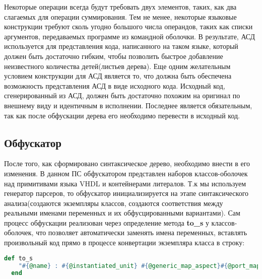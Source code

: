 Некоторые операции всегда будут требовать двух элементов, таких, как два слагаемых для операции суммирования. Тем не менее, некоторые языковые конструкции требуют сколь угодно большого числа операндов, таких как списки аргументов, передаваемых программе из командной оболочки. В результате, АСД используется для представления кода, написанного на таком языке, который должен быть достаточно гибким, чтобы позволить быстрое добавление неизвестного количества детей(листьев дерева).
Еще одним желательным условием конструкции для АСД является то, что должна быть обеспечена возможность представления АСД в виде исходного кода. Исходный код, сгенерированный из АСД, должен быть достаточно похожим на оригинал по внешнему виду и идентичным в исполнении. Последнее является обязательным, так как после обфускации дерева его необходимо перевести в исходный код.

\subsection{Обфускатор}
\label{sub:arch_and_mod:grammars}

После того, как сформировано синтаксическое дерево, необходимо внести в его изменения. В данном ПС обфускатором представлен наборов классов-оболочек над примитивами языка VHDL и контейнерами литералов.
Т.к мы используем генератор парсеров, то обфускатор инициализируется на этапе синтаксического анализа(создаются экземпляры классов, создаются соответствия между реальными именами переменных и их обфусцированными вариантами). Сам процесс обфускации реализован через определение метода \textbf{to\_s}  у классов-оболочек, что позволяет автоматически заменять имена переменных, вставлять произвольный код прямо в процессе конвертации экземпляра класса в строку:

\begin{lstlisting}[language=Ruby, style=rubystyle,caption={Определение метода перевода класса в строку для примитива component instantiation}, label=lst:arch_and_mod:wrapper_to_s]
  def to_s
    "#{@name} : #{@instantiated_unit} #{@generic_map_aspect}#{@port_map_aspect ? '' : ';'}#{@port_map_aspect}"
  end
\end{lstlisting}


